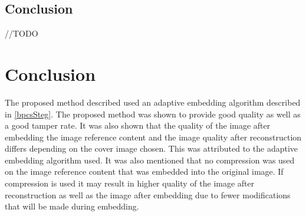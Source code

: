 \documentclass[12pt]{article}
\begin{document}
\subsection{Conclusion}
//TODO 

\section{Conclusion}
The proposed method described used an adaptive embedding algorithm described in \ref{bpcsSteg}.
The proposed method was shown to provide good quality as well as a good tamper rate.
It was also shown that the quality of the image after embedding the image reference content and the image quality after reconstruction differs depending on the cover image chosen.
This was attributed to the adaptive embedding algorithm used.
It was also mentioned that no compression was used on the image reference content that was embedded into the original image.
If compression is used it may result in higher quality of the image after reconstruction as well as the image after embedding due to fewer modifications that will be made during embedding.



\end{document}
